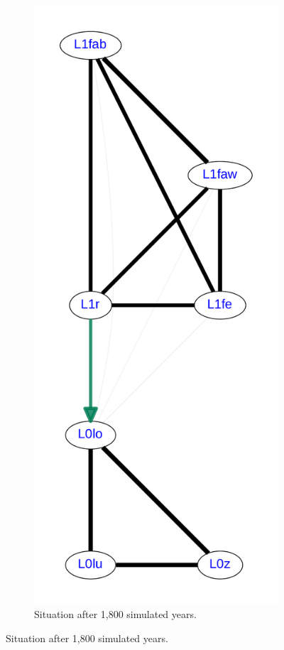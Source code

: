\begin{figure}
\begin{subfigure}{0.25\hsize}
 \centering
 \includegraphics[scale=0.12]{figures/sim-example-initial-map.pdf}
 \caption{Situation after 1,800 simulated years.}

\end{subfigure}
\end{figure}
